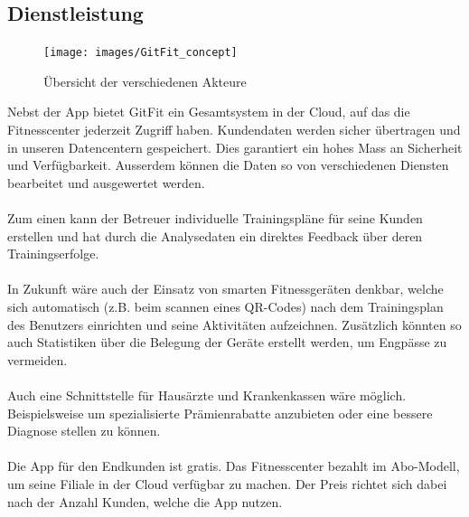 \subsection{Dienstleistung}
\begin{figure}[H]
	\centering
	\texttt{[image: images/GitFit\_concept]}
	\caption{Übersicht der verschiedenen Akteure}
	\label{fig:GitFit_concept}
\end{figure}
Nebst der App bietet GitFit ein Gesamtsystem in der Cloud, auf das die Fitnesscenter jederzeit Zugriff haben. Kundendaten werden sicher übertragen und in unseren Datencentern gespeichert. Dies garantiert ein hohes Mass an Sicherheit und Verfügbarkeit. Ausserdem können die Daten so von verschiedenen Diensten bearbeitet und ausgewertet werden. \\ \\
Zum einen kann der Betreuer individuelle Trainingspläne für seine Kunden erstellen und hat durch die Analysedaten ein direktes Feedback über deren Trainingserfolge. \\ \\
In Zukunft wäre auch der Einsatz von smarten Fitnessgeräten denkbar, welche sich automatisch (z.B. beim scannen eines QR-Codes) nach dem Trainingsplan des Benutzers einrichten und seine Aktivitäten aufzeichnen.
Zusätzlich könnten so auch Statistiken über die Belegung der Geräte erstellt werden, um Engpässe zu vermeiden. \\ \\
Auch eine Schnittstelle für Hausärzte und Krankenkassen wäre möglich. Beispielsweise um spezialisierte Prämienrabatte anzubieten oder eine bessere Diagnose stellen zu können. \\ \\
Die App für den Endkunden ist gratis. Das Fitnesscenter bezahlt im Abo-Modell, um seine Filiale in der Cloud verfügbar zu machen. Der Preis richtet sich dabei nach der Anzahl Kunden, welche die App nutzen.

